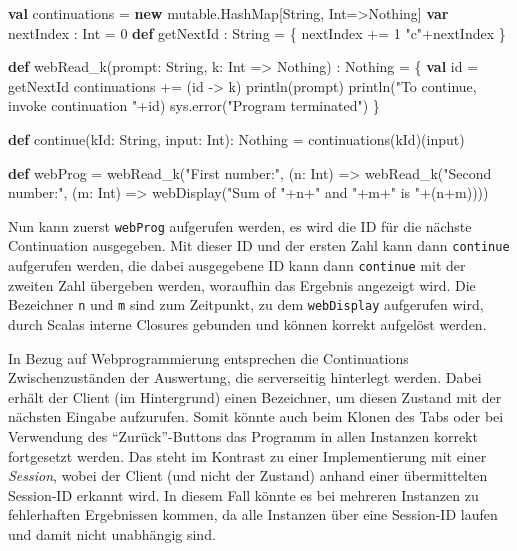 \documentclass[]{article}
\newenvironment{Shaded}{}{}
\newcommand{\DecValTok}[1]{\textcolor[rgb]{0.25,0.63,0.44}{#1}}
\newcommand{\FunctionTok}[1]{\textcolor[rgb]{0.02,0.16,0.49}{#1}}
\newcommand{\KeywordTok}[1]{\textcolor[rgb]{0.00,0.44,0.13}{\textbf{#1}}}
\newcommand{\NormalTok}[1]{#1}
\newcommand{\StringTok}[1]{\textcolor[rgb]{0.25,0.44,0.63}{#1}}
\begin{document}
\begin{Shaded}
\begin{Highlighting}[]
\KeywordTok{val}\NormalTok{ continuations = }\KeywordTok{new}\NormalTok{ mutable.}\FunctionTok{HashMap}\NormalTok{[String, Int=\textgreater{}Nothing]}
\KeywordTok{var}\NormalTok{ nextIndex : Int = }\DecValTok{0}
\KeywordTok{def}\NormalTok{ getNextId : String = \{}
\NormalTok{  nextIndex += }\DecValTok{1}
  \StringTok{"c"}\NormalTok{+nextIndex}
\NormalTok{\}}

\KeywordTok{def} \FunctionTok{webRead\_k}\NormalTok{(prompt: String, k: Int =\textgreater{} Nothing) : Nothing = \{}
  \KeywordTok{val}\NormalTok{ id = getNextId}
\NormalTok{  continuations += (id {-}\textgreater{} k)}
  \FunctionTok{println}\NormalTok{(prompt)}
  \FunctionTok{println}\NormalTok{(}\StringTok{"To continue, invoke continuation "}\NormalTok{+id)}
\NormalTok{  sys.}\FunctionTok{error}\NormalTok{(}\StringTok{"Program terminated"}\NormalTok{)}
\NormalTok{\}}

\KeywordTok{def} \FunctionTok{continue}\NormalTok{(kId: String, input: Int): Nothing = }\FunctionTok{continuations}\NormalTok{(kId)(input)}

\KeywordTok{def}\NormalTok{ webProg =}
  \FunctionTok{webRead\_k}\NormalTok{(}\StringTok{"First number:"}\NormalTok{, (n: Int) =\textgreater{}}
    \FunctionTok{webRead\_k}\NormalTok{(}\StringTok{"Second number:"}\NormalTok{, (m: Int) =\textgreater{}}
      \FunctionTok{webDisplay}\NormalTok{(}\StringTok{"Sum of "}\NormalTok{+n+}\StringTok{" and "}\NormalTok{+m+}\StringTok{" is "}\NormalTok{+(n+m))))}
\end{Highlighting}
\end{Shaded}

Nun kann zuerst \texttt{webProg} aufgerufen werden, es wird die ID für
die nächste Continuation ausgegeben. Mit dieser ID und der ersten Zahl
kann dann \texttt{continue} aufgerufen werden, die dabei ausgegebene ID
kann dann \texttt{continue} mit der zweiten Zahl übergeben werden,
woraufhin das Ergebnis angezeigt wird. Die Bezeichner \texttt{n} und
\texttt{m} sind zum Zeitpunkt, zu dem \texttt{webDisplay} aufgerufen
wird, durch Scalas interne Closures gebunden und können korrekt
aufgelöst werden.

In Bezug auf Webprogrammierung entsprechen die Continuations
Zwischenzuständen der Auswertung, die serverseitig hinterlegt werden.
Dabei erhält der Client (im Hintergrund) einen Bezeichner, um diesen
Zustand mit der nächsten Eingabe aufzurufen. Somit könnte auch beim
Klonen des Tabs oder bei Verwendung des ``Zurück''-Buttons das Programm
in allen Instanzen korrekt fortgesetzt werden. Das steht im Kontrast zu
einer Implementierung mit einer \emph{Session}, wobei der Client (und
nicht der Zustand) anhand einer übermittelten Session-ID erkannt wird.
In diesem Fall könnte es bei mehreren Instanzen zu fehlerhaften
Ergebnissen kommen, da alle Instanzen über eine Session-ID laufen und
damit nicht unabhängig sind.
\end{document}
